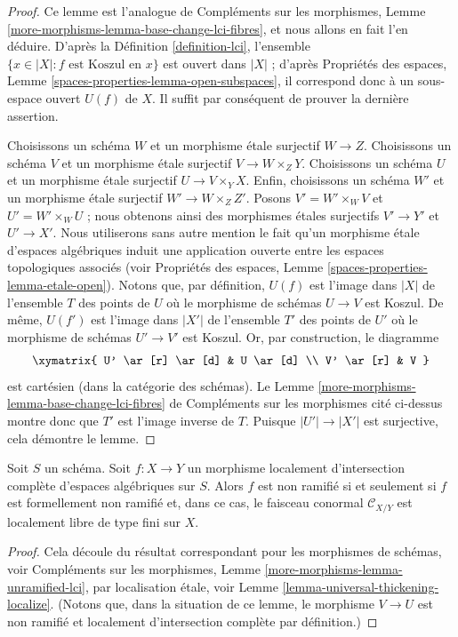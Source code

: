 \begin{proof}
Ce lemme est l'analogue de
Compléments sur les morphismes, Lemme \ref{more-morphisms-lemma-base-change-lci-fibres},
et nous allons en fait l'en déduire. D'après la
Définition \ref{definition-lci},
l'ensemble $\{x \in |X| : f \text{ est Koszul en }x\}$ est
ouvert dans $|X|$ ; d'après
Propriétés des espaces, Lemme \ref{spaces-properties-lemma-open-subspaces},
il correspond donc à un sous-espace ouvert $U(f)$ de $X$. Il suffit par conséquent de
prouver la dernière assertion.

\medskip\noindent
Choisissons un schéma $W$ et un morphisme étale surjectif $W \to Z$.
Choisissons un schéma $V$ et un morphisme étale surjectif $V \to W \times_Z Y$.
Choisissons un schéma $U$ et un morphisme étale surjectif $U \to V \times_Y X$.
Enfin, choisissons un schéma $W'$ et un morphisme étale surjectif
$W' \to W \times_Z Z'$.
Posons $V' = W' \times_W V$ et $U' = W' \times_W U$ ; nous obtenons ainsi des
morphismes étales surjectifs $V' \to Y'$ et $U' \to X'$.
Nous utiliserons sans autre mention le fait qu'un morphisme étale d'espaces algébriques
induit une application ouverte entre les espaces topologiques associés (voir
Propriétés des espaces, Lemme
\ref{spaces-properties-lemma-etale-open}).
Notons que, par définition, $U(f)$ est l'image dans $|X|$ de l'ensemble $T$
des points de $U$ où le morphisme de schémas $U \to V$ est Koszul.
De même, $U(f')$ est l'image dans $|X'|$ de l'ensemble $T'$ des points de
$U'$ où le morphisme de schémas $U' \to V'$ est Koszul. Or, par construction, le
diagramme
$$
\xymatrix{
U' \ar[r] \ar[d] & U \ar[d] \\
V' \ar[r] & V
}
$$
est cartésien (dans la catégorie des schémas). Le
Lemme \ref{more-morphisms-lemma-base-change-lci-fibres} de Compléments sur les morphismes
cité ci-dessus montre donc que $T'$ est l'image inverse de $T$. Puisque
$|U'| \to |X'|$ est surjective, cela démontre le lemme.
\end{proof}

\begin{lemma}
\label{lemma-unramified-lci}
Soit $S$ un schéma. Soit $f : X \to Y$ un morphisme localement d'intersection
complète d'espaces algébriques sur $S$. Alors $f$ est non ramifié si et seulement
si $f$ est formellement non ramifié et, dans ce cas, le faisceau conormal
$\mathcal{C}_{X/Y}$ est localement libre de type fini sur $X$.
\end{lemma}

\begin{proof}
Cela découle du résultat correspondant pour les morphismes de schémas, voir
Compléments sur les morphismes, Lemme \ref{more-morphisms-lemma-unramified-lci},
par localisation étale, voir
Lemme \ref{lemma-universal-thickening-localize}.
(Notons que, dans la situation de ce lemme, le morphisme $V \to U$
est non ramifié et localement d'intersection complète par définition.)
\end{proof}

